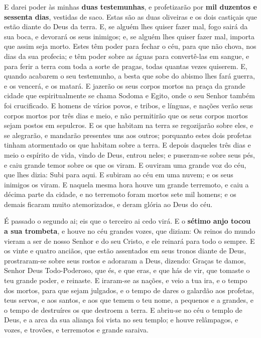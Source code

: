 E darei poder às minhas \textbf{duas testemunhas}, e profetizarão
por \textbf{mil duzentos e sessenta dias}, vestidas de saco.
Estas são as duas oliveiras e os dois castiçais que estão diante
do Deus da terra. E, se alguém lhes quiser fazer mal, fogo sairá
da sua boca, e devorará os seus inimigos; e, se alguém lhes quiser
fazer mal, importa que assim seja morto. Estes têm poder para
fechar o céu, para que não chova, nos dias da sua profecia; e têm
poder sobre as águas para convertê-las em sangue, e para ferir a
terra com toda a sorte de pragas, todas quantas vezes quiserem.
E, quando acabarem o seu testemunho, a besta que sobe do abismo
lhes fará guerra, e os vencerá, e os matará. E jazerão os seus
corpos mortos na praça da grande cidade que espiritualmente se chama
Sodoma e Egito, onde o seu Senhor também foi crucificado. E
homens de vários povos, e tribos, e línguas, e nações verão seus
corpos mortos por três dias e meio, e não permitirão que os seus
corpos mortos sejam postos em sepulcros. E os que habitam na
terra se regozijarão sobre eles, e se alegrarão, e mandarão
presentes uns aos outros; porquanto estes dois profetas tinham
atormentado os que habitam sobre a terra. E depois daqueles
três dias e meio o espírito de vida, vindo de Deus, entrou neles; e
puseram-se sobre seus pés, e caiu grande temor sobre os que os
viram. E ouviram uma grande voz do céu, que lhes dizia: Subi
para aqui. E subiram ao céu em uma nuvem; e os seus inimigos os
viram. E naquela mesma hora houve um grande terremoto, e caiu
a décima parte da cidade, e no terremoto foram mortos sete mil
homens; e os demais ficaram muito atemorizados, e deram glória ao
Deus do céu.

É passado o segundo ai; eis que o terceiro ai cedo virá. E
o \textbf{sétimo anjo tocou a sua trombeta}, e houve no céu grandes
vozes, que diziam: Os reinos do mundo vieram a ser de nosso Senhor e
do seu Cristo, e ele reinará para todo o sempre. E os vinte e
quatro anciãos, que estão assentados em seus tronos diante de Deus,
prostraram-se sobre seus rostos e adoraram a Deus, dizendo:
Graças te damos, Senhor Deus Todo-Poderoso, que és, e que eras, e
que hás de vir, que tomaste o teu grande poder, e reinaste. E
iraram-se as nações, e veio a tua ira, e o tempo dos mortos, para
que sejam julgados, e o tempo de dares o galardão aos profetas, teus
servos, e aos santos, e aos que temem o teu nome, a pequenos e a
grandes, e o tempo de destruíres os que destroem a terra. E
abriu-se no céu o templo de Deus, e a arca da sua aliança foi vista
no seu templo; e houve relâmpagos, e vozes, e trovões, e terremotos
e grande saraiva.

